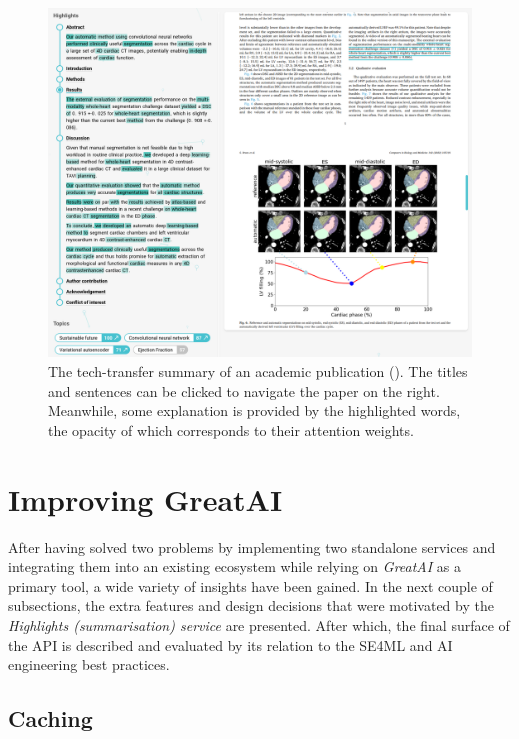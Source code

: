 \begin{figure}
    \centering
    \includegraphics[width=1\linewidth]{figures/dashboard-highlights.png}
    \captionsetup{width=.9\linewidth}
    \caption{The tech-transfer summary of an academic publication (\cite{bruns2022deep}). The titles and sentences can be clicked to navigate the paper on the right. Meanwhile, some explanation is provided by the highlighted words, the opacity of which corresponds to their attention weights.}
    \label{fig:dashboard-highlights}
\end{figure}

\section{Improving GreatAI}

After having solved two problems by implementing two standalone services and integrating them into an existing ecosystem while relying on \textit{GreatAI} as a primary tool, a wide variety of insights have been gained. In the next couple of subsections, the extra features and design decisions that were motivated by the \textit{Highlights (summarisation) service} are presented. After which, the final surface of the API is described and evaluated by its relation to the SE4ML \cite{serban2020adoption,serban2021practices} and AI engineering \cite{john2020architecting,john2020ai} best practices.

\subsection{Caching}

